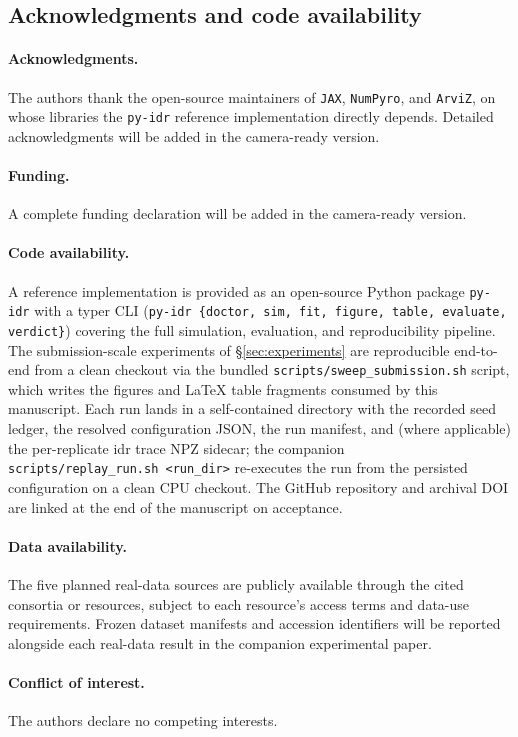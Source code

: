 \subsection*{Acknowledgments and code availability}

\paragraph{Acknowledgments.}
The authors thank the open-source maintainers of \texttt{JAX},
\texttt{NumPyro}, and \texttt{ArviZ}, on whose libraries the
\texttt{py-idr} reference implementation directly depends. Detailed
acknowledgments will be added in the camera-ready version.

\paragraph{Funding.}
A complete funding declaration will be added in the camera-ready version.

\paragraph{Code availability.}
A reference implementation is provided as an open-source Python package
\texttt{py-idr} with a typer CLI (\texttt{py-idr \{doctor, sim, fit, figure,
table, evaluate, verdict\}}) covering the full simulation, evaluation,
and reproducibility pipeline. The submission-scale experiments of
\S\ref{sec:experiments} are reproducible end-to-end from a clean checkout
via the bundled \texttt{scripts/sweep\_submission.sh} script, which writes
the figures and LaTeX table fragments consumed by this manuscript. Each
run lands in a self-contained directory with the recorded seed ledger,
the resolved configuration JSON, the run manifest, and (where applicable)
the per-replicate idr trace NPZ sidecar; the companion
\texttt{scripts/replay\_run.sh~<run\_dir>} re-executes the run from the
persisted configuration on a clean CPU checkout. The GitHub repository
and archival DOI are linked at the end of the manuscript on acceptance.

\paragraph{Data availability.}
The five planned real-data sources are publicly available through the
cited consortia or resources, subject to each resource's access terms
and data-use requirements. Frozen dataset manifests and accession
identifiers will be reported alongside each real-data result in the
companion experimental paper.

\paragraph{Conflict of interest.}
The authors declare no competing interests.
